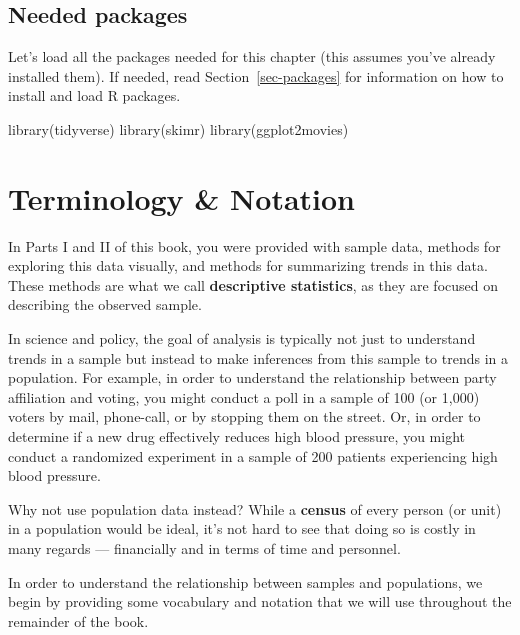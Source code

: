 \documentclass[
  letterpaper,
  DIV=11,
  numbers=noendperiod]{scrreprt}
\newenvironment{Shaded}{\begin{snugshade}}{\end{snugshade}}
\newcommand{\FunctionTok}[1]{\textcolor[rgb]{0.28,0.35,0.67}{#1}}
\newcommand{\NormalTok}[1]{\textcolor[rgb]{0.00,0.23,0.31}{#1}}
\theoremstyle{definition}
\theoremstyle{remark}
\begin{document}
\hypertarget{needed-packages-2}{%
\subsection*{Needed packages}\label{needed-packages-2}}

Let's load all the packages needed for this chapter (this assumes you've
already installed them). If needed, read Section~\ref{sec-packages} for
information on how to install and load R packages.

\begin{Shaded}
\begin{Highlighting}[]
\FunctionTok{library}\NormalTok{(tidyverse)}
\FunctionTok{library}\NormalTok{(skimr)}
\FunctionTok{library}\NormalTok{(ggplot2movies)}
\end{Highlighting}
\end{Shaded}

\hypertarget{sec-terminology}{%
\section{Terminology \& Notation}\label{sec-terminology}}

In Parts I and II of this book, you were provided with sample data,
methods for exploring this data visually, and methods for summarizing
trends in this data. These methods are what we call \textbf{descriptive
statistics}, as they are focused on describing the observed sample.

In science and policy, the goal of analysis is typically not just to
understand trends in a sample but instead to make inferences from this
sample to trends in a population. For example, in order to understand
the relationship between party affiliation and voting, you might conduct
a poll in a sample of 100 (or 1,000) voters by mail, phone-call, or by
stopping them on the street. Or, in order to determine if a new drug
effectively reduces high blood pressure, you might conduct a randomized
experiment in a sample of 200 patients experiencing high blood pressure.

Why not use population data instead? While a \textbf{census} of every
person (or unit) in a population would be ideal, it's not hard to see
that doing so is costly in many regards --- financially and in terms of
time and personnel.

In order to understand the relationship between samples and populations,
we begin by providing some vocabulary and notation that we will use
throughout the remainder of the book.
\end{document}
